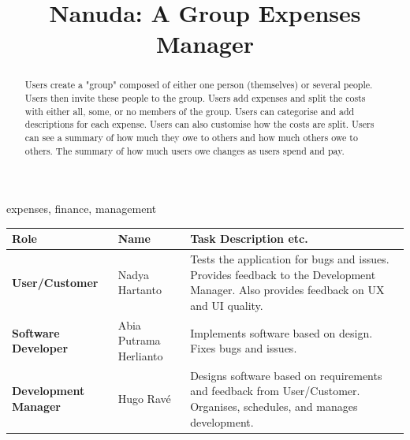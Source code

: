 \documentclass[conference]{IEEEtran}
\begin{document}
\title{Nanuda: A Group Expenses Manager}

\author{
\and
{}
\and
{}
}

\maketitle

\begin{abstract}
Users create a "group" composed of either one person (themselves) or several people. Users then invite these people to the group. Users add expenses and split the costs with either all, some, or no members of the group. Users can categorise and add descriptions for each expense. Users can also customise how the costs are split. Users can see a summary of how much they owe to others and how much others owe to others. The summary of how much users owe changes as users spend and pay.
\end{abstract}

\begin{IEEEkeywords}
expenses, finance, management
\end{IEEEkeywords}

\begin{center}
\begin{tabular}{|p{6em}|p{5em}|p{10em}|}
\hline
\textbf{Role} & \textbf{Name} & \textbf{Task Description etc.} \\
\hline
\textbf{User/Customer} & Nadya Hartanto & Tests the application for bugs and issues. Provides feedback to the Development Manager.
Also provides feedback on UX and UI quality. \\
\hline
\textbf{Software Developer} & Abia Putrama Herlianto & Implements software based on design. Fixes bugs and issues. \\
\hline
\textbf{Development Manager} & Hugo Ravé & Designs software based on requirements and feedback from User/Customer. Organises, schedules, and manages development. \\
\hline
\end{tabular}
\end{center}
\end{document}
